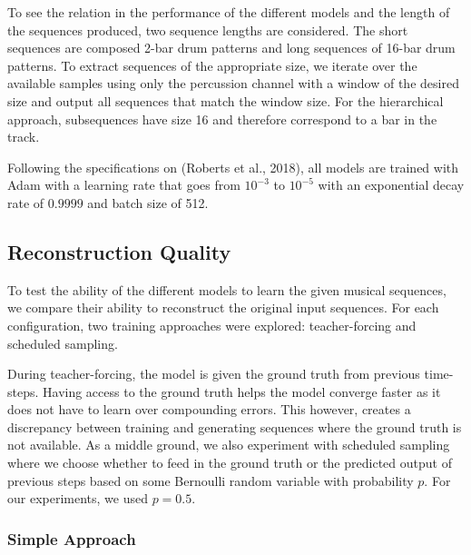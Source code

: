 \documentclass[10pt,twocolumn]{article}
\begin{document}
To see the relation in the performance of the different models and the length of the sequences produced, two sequence lengths are considered. The short sequences are composed 2-bar drum patterns and long sequences of 16-bar drum patterns. To extract sequences of the appropriate size, we iterate over the available samples using only the percussion channel with a window of the desired size and output all sequences that match the window size. For the hierarchical approach, subsequences have size 16 and therefore correspond to a bar in the track.

Following the specifications on (Roberts et al., 2018), all models are trained with Adam with a learning rate that goes from $10^{-3}$ to $10^{-5}$ with an exponential decay rate of $0.9999$ and batch size of 512.

\subsection{Reconstruction Quality}
To test the ability of the different models to learn the given musical sequences, we compare their ability to reconstruct the original input sequences. For each configuration, two training approaches were explored: teacher-forcing and scheduled sampling.

During teacher-forcing, the model is given the ground truth from previous time-steps. Having access to the ground truth helps the model converge faster as it does not have to learn over compounding errors. This however, creates a discrepancy between training and generating sequences where the ground truth is not available. As a middle ground, we also experiment with scheduled sampling where we choose whether to feed in the ground truth or the predicted output of previous steps based on some Bernoulli random variable with probability $p$. For our experiments, we used $p = 0.5$.

\subsubsection{Simple Approach}
\end{document}

